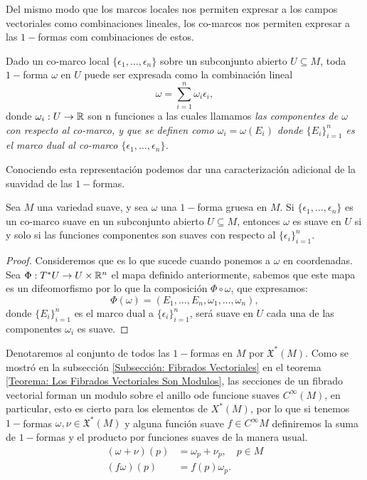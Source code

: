 Del mismo modo que los marcos locales nos permiten expresar a los campos vectoriales como combinaciones lineales, los co-marcos nos permiten expresar a las $1-$formas com combinaciones de estos.

Dado un co-marco local $\{\epsilon_1,\ldots,\epsilon_n\}$ sobre un subconjunto abierto $U \subseteq M$, toda $1-$forma $\omega$ en $U$ puede ser expresada como la combinación lineal
\[
	\omega = \sum_{i=1}^{n} \omega_i \epsilon_i,
\]
donde $\omega_i: U \to \mathbb{R}$ son n funciones a las cuales llamamos \it{las componentes de $\omega$ con respecto al co-marco}, y que se definen como $\omega_i = \omega(E_i)$ donde $\{E_i\}_{i=1}^n$ es el marco dual al co-marco $\{\epsilon_1,\ldots,\epsilon_n\}$.

Conociendo esta representación podemos dar una caracterización adicional de la suavidad de las $1-$formas.

\begin{theorem}
	Sea $M$ una variedad suave, y sea $\omega$ una $1-$forma gruesa en $M$. Si $\{\epsilon_1,\ldots,\epsilon_n\}$ es un co-marco suave en un subconjunto abierto $U \subseteq M$, entonces $\omega$ es suave en $U$ si y solo si las funciones componentes son suaves con respecto al $\{\epsilon_i\}_{i=1}^n$.
\end{theorem}

\begin{proof}
	Consideremos que es lo que sucede cuando ponemos a $\omega$ en coordenadas. Sea $\Phi: T^{*}U \to U \times \mathbb{R}^n$ el mapa definido anteriormente, sabemos que este mapa es un difeomorfismo por lo que la composición $\Phi \circ \omega$, que expresamos:
	\[
		\Phi(\omega) = (E_1, \ldots, E_n, \omega_1, \ldots, \omega_n),
	\]
	donde $\{E_i\}_{i=1}^n$ es el marco dual a $\{\epsilon_i\}_{i=1}^n$, será suave en $U$ cada una de las componentes $\omega_i$ es suave.
\end{proof}

Denotaremos al conjunto de todos las $1-$formas en $M$ por $\mathfrak{X}^*(M)$. Como se mostró en la subsección \ref{Subsección: Fibrados Vectoriales} en el teorema \ref{Teorema: Los Fibrados Vectoriales Son Modulos}, las secciones de un fibrado vectorial forman un modulo sobre el anillo ode funcione suaves $C^{\infty}(M)$, en particular, esto es cierto para los elementos de $X^{*}(M)$, por lo que si tenemos $1-$formas $\omega,\nu \in \mathfrak{X}^*(M)$ y alguna función suave $f \in C^{\infty}M$ definiremos la suma de $1-$formas y el producto por funciones suaves de la manera usual.
\begin{align*}
	(\omega + \nu)(p) & = \omega_p + \nu_p, \quad p \in M \\
	(f\omega)(p)      & = f(p)\omega_p.
\end{align*}
